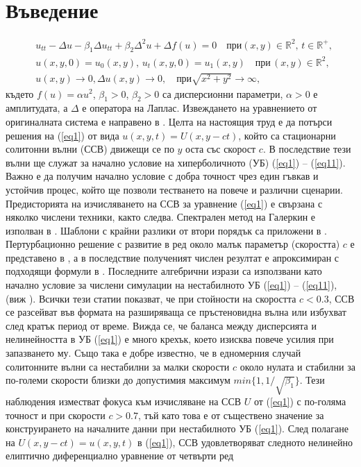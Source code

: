 \documentclass{article}
\newcommand{\rf}[1]{(\ref{#1})}
\newcommand{\RR}{\mathbb{R}}
\theoremstyle{remark}
\begin{document}
\section{Въведение}\label{introduction}

\begin{align}
&u_{tt} - \Delta u -\beta_1  \Delta u_{tt} +\beta_2 \Delta ^2 u + \Delta f(u)=0   \quad \text{при}  (x,y) \in \RR^2, \, t\in\RR^+,\label{eq1}
\\ \nonumber &u(x,y,0)=u_0(x,y), \, u_t(x,y,0)=u_1(x,y)   \quad\text{при} \, (x,y) \in \RR^2,
\\  &u(x,y) \rightarrow 0,  \Delta u(x,y) \rightarrow 0 ,  \quad \text{при}  \sqrt{x^2 + y^2} \rightarrow \infty, \label{eq11}
\end{align}
където $f(u)=\alpha u^2$, $\beta_1>0$, $\beta_2>0$ са дисперсионни параметри,  $\alpha>0$ е амплитудата, а $\Delta$ е оператора на Лаплас. Извеждането на уравнението от оригиналната система е направено в \cite{ChChr}. Целта на настоящия труд е да потърси решения на \rf{eq1} от вида $u(x,y,t)=U(x,y-ct)$, който са стационарни солитонни вълни (ССВ) движещи се по $y$ оста със скорост $c$. В последствие тези вълни ще служат за начално условие на хиперболичното (УБ) \rf{eq1} -- \rf{eq11}. Важно е да получим начално условие с добра точност чрез един гъвкав и устойчив процес, който ще позволи тестването на повече и различни сценарии. Предисторията на изчисляването на ССВ за уравнение \rf{eq1} е свързана с няколко числени техники, както следва. Спектрален метод на Галеркин е изполван в \cite{chr-chr-07,chr-chr}. Шаблони с крайни разлики от втори порядък са приложени в \cite{Ch2012}. Пертурбационно решение с развитие в ред около малък параметър (скоростта) $c$ е представено в  \cite{Ch2011}, а в последствие полученият числен резултат е апроксимиран с подходящи формули в \cite{Ch2011}. Последните алгебрични изрази са използвани като начално условие за числени симулации на нестабилното УБ \rf{eq1} -- \rf{eq11}, (виж  \cite{ref21, dani, milenaDani, ref22}). Всички тези статии показват, че при стойности на скоростта $c<0.3$, ССВ се разсейват във формата на разширяваща се пръстеновидна вълна или избухват след кратък период от време. Вижда се, че баланса между дисперсията и нелинейността в УБ \rf{eq1} е много крехък, което изисква повече усилия при запазването му. Също така е добре известно, че в едномерния случай солитонните вълни са нестабилни за малки скорости $c$ около нулата и стабилни за по-големи скорости близки до допустимия максимум $min\{1, 1/\sqrt{\beta_1}\}$.
Тези наблюдения изместват фокуса към изчисляване на ССВ $U$ от \rf{eq1} с по-голяма точност и при скорости $c > 0.7$, тъй като това е от съществено значение за конструирането на началните данни при нестабилното УБ \rf{eq1}. 
След полагане на $U(x,y-ct)=u(x,y,t)$ в \rf{eq1}, ССВ удовлетворяват следното нелинейно елиптично диференциално уравнение от четвърти ред
\end{document}
